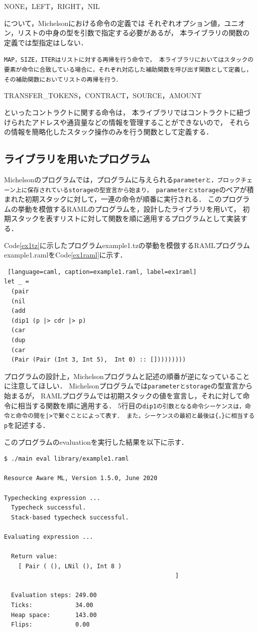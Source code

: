 \documentclass{kuisthesis}
\begin{document}
\begin{itemize}
{  \item NONE，LEFT，RIGHT，NIL}について，Michelsonにおける命令の定義では
  それぞれオプション値，ユニオン，リストの中身の型を引数で指定する必要があるが，
  本ライブラリの関数の定義では型指定はしない．
  \item{\tt MAP，SIZE，ITERはリストに対する再帰を行う命令で，
  本ライブラリにおいてはスタックの要素が命令に合致している場合に，それぞれ対応した補助関数を呼び出す関数として定義し，
  その補助関数においてリストの再帰を行う．
  \item TRANSFER\_TOKENS，CONTRACT，SOURCE，AMOUNT}といったコントラクトに関する命令は，
  本ライブラリではコントラクトに紐づけられたアドレスや通貨量などの情報を管理することができないので，
  それらの情報を簡略化したスタック操作のみを行う関数として定義する．
\end{itemize}

\subsection{ライブラリを用いたプログラム} \label{subsec-pro-pro}
Michelsonのプログラムでは，プログラムに与えられる{\tt parameterと，ブロックチェーン上に保存されているstorageの型宣言から始まり，
parameterとstorage}のペアが積まれた初期スタックに対して，一連の命令が順番に実行される．
このプログラムの挙動を模倣するRAMLのプログラムを，設計したライブラリを用いて，
初期スタックを表すリストに対して関数を順に適用するプログラムとして実装する．

Code\ref{ex1tz}に示したプログラムexample1.tzの挙動を模倣するRAMLプログラムexample1.ramlをCode\ref{ex1raml}に示す．

\begin{lstlisting} [language=caml, caption=example1.raml, label=ex1raml]
let _ =
  (pair
  (nil
  (add
  (dip1 (p |> cdr |> p)
  (car
  (dup
  (car
  (Pair (Pair (Int 3, Int 5),  Int 0) :: []))))))))
\end{lstlisting}

プログラムの設計上，Michelsonプログラムと記述の順番が逆になっていることに注意してほしい．
Michelsonプログラムでは{\tt parameterとstorage}の型宣言から始まるが，
RAMLプログラムでは初期スタックの値を宣言し，それに対して命令に相当する関数を順に適用する．
5行目の{\tt dip1の引数となる命令シーケンスは，命令と命令の間を|>で繋ぐことによって表す．
また，シーケンスの最初と最後は\{，\}に相当するp}を記述する．

このプログラムのevaluationを実行した結果を以下に示す．

\begin{lstlisting}[basicstyle={\ttfamily\color{base}\scriptsize}]
$ ./main eval library/example1.raml

Resource Aware ML, Version 1.5.0, June 2020

Typechecking expression ...
  Typecheck successful.
  Stack-based typecheck successful.

Evaluating expression ...

  Return value:
    [ Pair ( (), LNil (), Int 8 )
                                                ]

  Evaluation steps: 249.00
  Ticks:            34.00
  Heap space:       143.00
  Flips:            0.00
\end{lstlisting}
\end{document}
